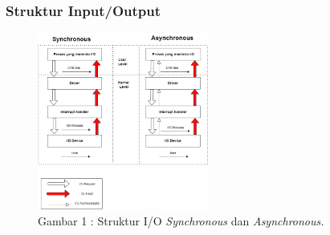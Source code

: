 \documentclass[12pt]{article}
\begin{document}
\subsubsection{Struktur Input/Output}
\begin{figure}[h] %
    \centering
    \includegraphics[width=0.5\textwidth]{asset/Struktur_IO.png}
    \captionsetup{labelformat=empty}
    \caption{Gambar 1 : Struktur I/O \emph{Synchronous} dan \emph{Asynchronous.}}
    \label{Gambar 1}
\end{figure}
\end{document}
